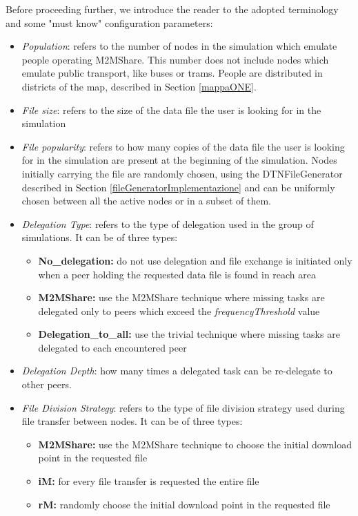 Before proceeding further, we introduce the reader to the adopted terminology and some "must know" configuration parameters:
\begin{itemize}
\item \textit{Population}: refers to the number of nodes in the simulation which emulate people operating M2MShare. This number does not include nodes which emulate public transport, like buses or trams. People are distributed in districts of the map, described in Section \ref{mappaONE}.

\item \textit{File size}: refers to the size of the data file the user is looking for in the simulation 

\item \textit{File popularity}: refers to how many copies of the data file the user is looking for in the simulation are present at the beginning of the simulation. Nodes initially carrying the file are randomly chosen, using the DTNFileGenerator described in Section \ref{fileGeneratorImplementazione} and can be uniformly chosen between all the active nodes or in a subset of them.

\item \textit{Delegation Type}: refers to the type of delegation used in the group of simulations. It can be of three types:
\begin{itemize}
\item \textbf{No\_delegation:} do not use delegation and file exchange is initiated only when a peer holding the requested data file is found in reach area 
\item \textbf{M2MShare:} use the M2MShare technique where missing tasks are delegated only to peers which exceed the \textit{frequencyThreshold} value
\item \textbf{Delegation\_to\_all:} use the trivial technique where missing tasks are delegated to each encountered peer
\end{itemize}

\item \textit{Delegation Depth}: how many times a delegated task can be re-delegate to other peers.

\item \textit{File Division Strategy}: refers to the type of file division strategy used during file transfer between nodes. It can be of three types:
\begin{itemize}
\item \textbf{M2MShare:} use the M2MShare technique to choose the initial download point in the requested file
\item \textbf{iM:} for every file transfer is requested the entire file
\item \textbf{rM:} randomly choose the initial download point in the requested file
\end{itemize}


\end{itemize}
